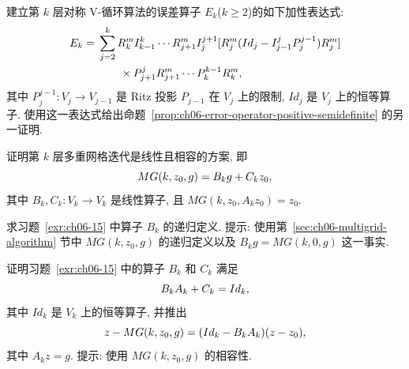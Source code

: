\begin{MBExercise}
\label{exr:ch06-14}
建立第 $k$ 层对称 V-循环算法的误差算子 $E_k$($k\geq2$)的如下加性表达式:
\[
\MathBookFormulaID{formula-ch06-exercise-14-additive-error-operator}
\begin{aligned}
E_k={}&\sum_{j=2}^k
R_k^m I_{k-1}^k\cdots R_{j+1}^m I_j^{j+1}
[R_j^m(Id_j-I_{j-1}^jP_j^{j-1})R_j^m]\\
&\qquad\times P_{j+1}^jR_{j+1}^m\cdots P_k^{k-1}R_k^m,
\end{aligned}
\]
其中 $P_j^{j-1}:V_j\longrightarrow V_{j-1}$ 是 Ritz 投影 $P_{j-1}$ 在 $V_j$ 上的限制, $Id_j$ 是 $V_j$ 上的恒等算子. 使用这一表达式给出命题~\ref{prop:ch06-error-operator-positive-semidefinite} 的另一证明.
\end{MBExercise}

\begin{MBExercise}
\label{exr:ch06-15}
证明第 $k$ 层多重网格迭代是线性且相容的方案, 即
\[
\MathBookFormulaID{formula-ch06-exercise-15-linear-consistent-scheme}
MG(k,z_0,g)=B_kg+C_kz_0,
\]
其中 $B_k,C_k:V_k\longrightarrow V_k$ 是线性算子, 且 $MG(k,z_0,A_kz_0)=z_0$.
\end{MBExercise}

\begin{MBExercise}
\label{exr:ch06-16}
求习题~\ref{exr:ch06-15} 中算子 $B_k$ 的递归定义. 提示: 使用第~\ref{sec:ch06-multigrid-algorithm} 节中 $MG(k,z_0,g)$ 的递归定义以及 $B_kg=MG(k,0,g)$ 这一事实.
\end{MBExercise}

\begin{MBExercise}
\label{exr:ch06-17}
证明习题~\ref{exr:ch06-15} 中的算子 $B_k$ 和 $C_k$ 满足
\[
\MathBookFormulaID{formula-ch06-exercise-17-operator-consistency}
B_kA_k+C_k=Id_k,
\]
其中 $Id_k$ 是 $V_k$ 上的恒等算子, 并推出
\[
\MathBookFormulaID{formula-ch06-exercise-17-error-factorization}
z-MG(k,z_0,g)=(Id_k-B_kA_k)(z-z_0),
\]
其中 $A_kz=g$. 提示: 使用 $MG(k,z_0,g)$ 的相容性.
\end{MBExercise}
